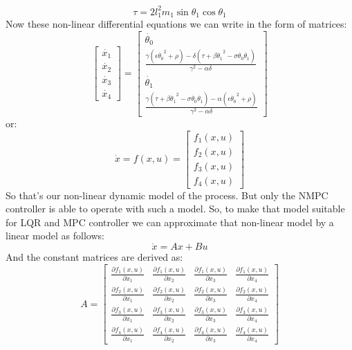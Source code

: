 \begin{equation}\tau = 2l^2_1m_1\sin\theta_1\cos\theta_1\end{equation}
Now these non-linear differential equations we can write in the form of matrices:
\begin{equation}\label{nonlinmodel}
\begin{bmatrix}
\dot{x_1} \\ \dot{x_2} \\ \dot{x_3} \\ \dot{x_4}
\end{bmatrix} = \begin{bmatrix}
\dot{\theta_0}\\
\frac{\gamma(\epsilon\dot{\theta_0}^2+\rho)-\delta(\tau+\beta\dot{\theta_1}^2-\sigma\dot{\theta_0}\dot{\theta_1})}{\gamma^2-\alpha\delta}\\
\dot{\theta_1}\\
 \frac{\gamma(\tau+\beta\dot{\theta_1}^2-\sigma\dot{\theta_0}\dot{\theta_1})-\alpha(\epsilon\dot{\theta_0}^2+\rho)}{\gamma^2-\alpha\delta}
\end{bmatrix}
\end{equation}
or:
\begin{equation}\dot{x} = f(x,u) =\begin{bmatrix}f_1(x,u)\\f_2(x,u)\\f_3(x,u)\\f_4(x,u)\end{bmatrix} \end{equation}
So that’s our non-linear dynamic model of the process. But only the NMPC controller is able to operate with such a model.  So, to make that model suitable for LQR and MPC controller we can approximate that non-linear model by a linear model as follows:
\begin{equation}\dot{x} = Ax + Bu\end{equation}
And the constant matrices are derived as:
\begin{equation}
A = \begin{bmatrix}
\frac{\partial f_1(x,u)}{\partial x_1}&\frac{\partial f_1(x,u)}{\partial x_2}&\frac{\partial f_1(x,u)}{\partial x_3}&\frac{\partial f_1(x,u)}{\partial x_4}\\
\frac{\partial f_2(x,u)}{\partial x_1}&\frac{\partial f_2(x,u)}{\partial x_2}&\frac{\partial f_2(x,u)}{\partial x_3}&\frac{\partial f_2(x,u)}{\partial x_4}\\
\frac{\partial f_3(x,u)}{\partial x_1}&\frac{\partial f_3(x,u)}{\partial x_2}&\frac{\partial f_3(x,u)}{\partial x_3}&\frac{\partial f_3(x,u)}{\partial x_4}\\
\frac{\partial f_4(x,u)}{\partial x_1}&\frac{\partial f_4(x,u)}{\partial x_2}&\frac{\partial f_4(x,u)}{\partial x_3}&\frac{\partial f_4(x,u)}{\partial x_4}
\end{bmatrix}
\end{equation}
